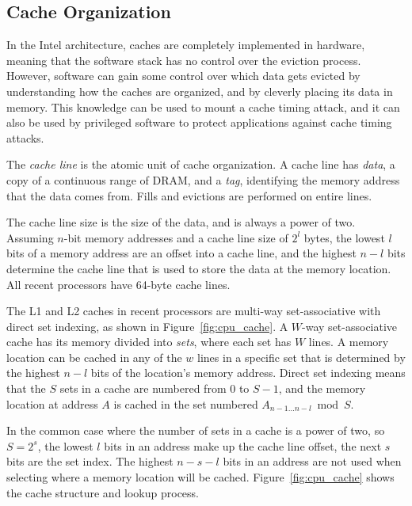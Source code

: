 \subsection{Cache Organization}
\label{sec:cache_org}

In the Intel architecture, caches are completely implemented in hardware,
meaning that the software stack has no control over the eviction process.
However, software can gain some control over which data gets evicted by
understanding how the caches are organized, and by cleverly placing its data in
memory. This knowledge can be used to mount a cache timing attack, and it can
also be used by privileged software to protect applications against cache
timing attacks.

The \textit{cache line} is the atomic unit of cache organization. A cache line
has \textit{data}, a copy of a continuous range of DRAM, and a \textit{tag},
identifying the memory address that the data comes from. Fills and evictions
are performed on entire lines.

The cache line size is the size of the data, and is always a power of two.
Assuming $n$-bit memory addresses and a cache line size of $2^{l}$ bytes, the
lowest $l$ bits of a memory address are an offset into a cache line, and the
highest $n - l$ bits determine the cache line that is used to store the data at
the memory location. All recent processors have 64-byte cache lines.

The L1 and L2 caches in recent processors are multi-way set-associative with
direct set indexing, as shown in Figure~\ref{fig:cpu_cache}. A $W$-way
set-associative cache has its memory divided into \textit{sets}, where each set
has $W$ lines. A memory location can be cached in any of the $w$ lines in a
specific set that is determined by the highest $n - l$ bits of the location's
memory address. Direct set indexing means that the $S$ sets in a cache are
numbered from $0$ to $S - 1$, and the memory location at address $A$ is cached
in the set numbered $A_{n - 1 \ldots n - l} \bmod S$.

In the common case where the number of sets in a cache is a power of two, so $S
= 2^{s}$, the lowest $l$ bits in an address make up the cache line offset, the
next $s$ bits are the set index. The highest $n - s - l$ bits in an address are
not used when selecting where a memory location will be cached.
Figure~\ref{fig:cpu_cache} shows the cache structure and lookup process.

